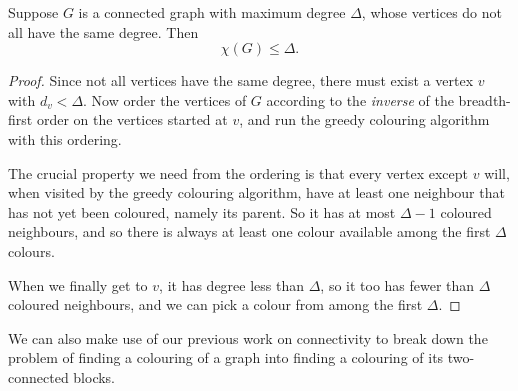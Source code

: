 \documentclass[nobib]{tufte-handout}
\begin{document}
\begin{lemma}\label{lemma:brooks_for_irregular}
  Suppose $G$ is a connected graph with maximum degree $\Delta$, whose vertices do not all have the same degree. Then
  $$\chi(G) \leq \Delta.$$

  \begin{proof}
    Since not all vertices have the same degree, there must exist a vertex $v$ with $d_v < \Delta$. Now order the vertices of $G$ according to the \emph{inverse} of the breadth-first order on the vertices started at $v$, and run the greedy colouring algorithm with this ordering.

    The crucial property we need from the ordering is that every vertex except $v$ will, when visited by the greedy colouring algorithm, have at least one neighbour that has not yet been coloured, namely its parent. So it has at most $\Delta - 1$ coloured neighbours, and so there is always at least one colour available among the first $\Delta$ colours.

    When we finally get to $v$, it has degree less than $\Delta$, so it too has fewer than $\Delta$ coloured neighbours, and we can pick a colour from among the first $\Delta$.
  \end{proof}
\end{lemma}

We can also make use of our previous work on connectivity to break down the problem of finding a colouring of a graph into finding a colouring of its two-connected blocks.
\end{document}
